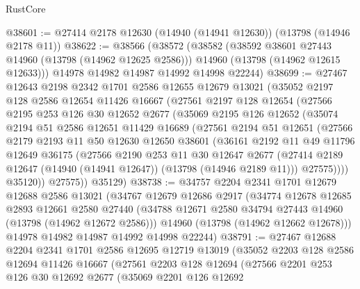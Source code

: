 \begin{lexlean}{RustCore}
\begin{coremodule}
@38601 := @27414 @2178 @12630 (@14940 (@14941 @12630)) (@13798 (@14946 @2178 @11))
@38622 := @38566
    (@38572
      (@38582
        (@38592 @38601 @27443 @14960 (@13798 (@14962 @12625 @2586)))
        @14960
        (@13798 (@14962 @12615 @12633)))
      @14978
      @14982
      @14987
      @14992
      @14998
      @22244)
@38699 := @27467
    @12643
    @2198
    @2342
    @1701
    @2586
    @12655
    @12679
    @13021
    (@35052
      @2197
      @128
      @2586
      @12654
      @11426
      @16667
      (@27561
        @2197
        @128
        @12654
        (@27566
          @2195
          @253
          @126
          @30
          @12652
          @2677
          (@35069
            @2195
            @126
            @12652
            (@35074
              @2194
              @51
              @2586
              @12651
              @11429
              @16689
              (@27561
                @2194
                @51
                @12651
                (@27566
                  @2179
                  @2193
                  @11
                  @50
                  @12630
                  @12650
                  @38601
                  (@36161
                    @2192
                    @11
                    @49
                    @11796
                    @12649
                    @36175
                    (@27566
                      @2190
                      @253
                      @11
                      @30
                      @12647
                      @2677
                      (@27414 @2189 @12647 (@14940 (@14941 @12647)) (@13798 (@14946 @2189 @11)))
                      @27575))))
              @35120))
          @27575))
      @35129)
@38738 := @34757
    @2204
    @2341
    @1701
    @12679
    @12688
    @2586
    @13021
    (@34767
      @12679
      @12686
      @2917
      (@34774
        @12678
        @12685
        @2893
        @12661
        @2580
        @27440
        (@34788 @12671 @2580 @34794 @27443 @14960 (@13798 (@14962 @12672 @2586)))
        @14960
        (@13798 (@14962 @12662 @12678)))
      @14978
      @14982
      @14987
      @14992
      @14998
      @22244)
@38791 := @27467
    @12688
    @2204
    @2341
    @1701
    @2586
    @12695
    @12719
    @13019
    (@35052
      @2203
      @128
      @2586
      @12694
      @11426
      @16667
      (@27561
        @2203
        @128
        @12694
        (@27566
          @2201
          @253
          @126
          @30
          @12692
          @2677
          (@35069
            @2201
            @126
            @12692

\end{coremodule}
\end{lexlean}
